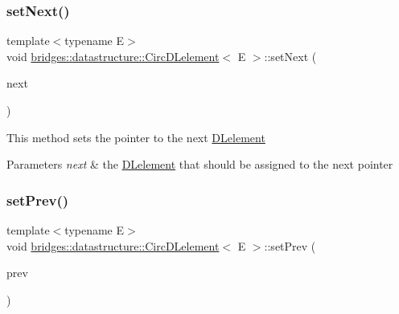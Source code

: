 \subsubsection{\texorpdfstring{set\+Next()}{setNext()}}
{\footnotesize\ttfamily template$<$typename E$>$ \\
void \hyperlink{classbridges_1_1datastructure_1_1_circ_d_lelement}{bridges\+::datastructure\+::\+Circ\+D\+Lelement}$<$ E $>$\+::set\+Next (\begin{DoxyParamCaption}\item[{\hyperlink{classbridges_1_1datastructure_1_1_circ_d_lelement}{Circ\+D\+Lelement}$<$ E $>$ $\ast$}]{next }\end{DoxyParamCaption})\hspace{0.3cm}{\ttfamily [inline]}}

This method sets the pointer to the next \hyperlink{classbridges_1_1datastructure_1_1_d_lelement}{D\+Lelement}


\begin{DoxyParams}{Parameters}
{\em next} & the \hyperlink{classbridges_1_1datastructure_1_1_d_lelement}{D\+Lelement} that should be assigned to the next pointer \\
\hline
\end{DoxyParams}
\mbox{\label{classbridges_1_1datastructure_1_1_circ_d_lelement_ac47b0221a0eebc3c539eec1700f2c776}} 
\subsubsection{\texorpdfstring{set\+Prev()}{setPrev()}}
{\footnotesize\ttfamily template$<$typename E$>$ \\
void \hyperlink{classbridges_1_1datastructure_1_1_circ_d_lelement}{bridges\+::datastructure\+::\+Circ\+D\+Lelement}$<$ E $>$\+::set\+Prev (\begin{DoxyParamCaption}\item[{\hyperlink{classbridges_1_1datastructure_1_1_circ_d_lelement}{Circ\+D\+Lelement}$<$ E $>$ $\ast$}]{prev }\end{DoxyParamCaption})\hspace{0.3cm}{\ttfamily [inline]}}

